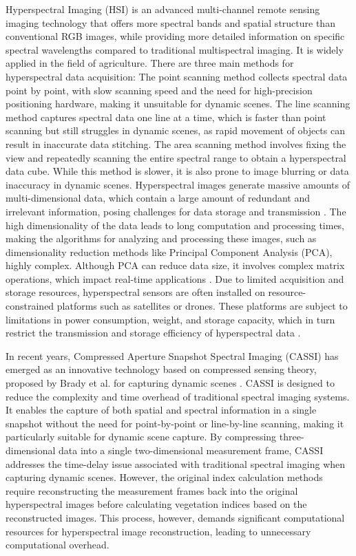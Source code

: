 \documentclass[preprint,review,12pt]{elsarticle}
\begin{document}
Hyperspectral Imaging (HSI) is an advanced multi-channel remote sensing imaging technology that offers more spectral bands and spatial structure than conventional RGB images, while providing more detailed information on specific spectral wavelengths compared to traditional multispectral imaging. It is widely applied in the field of agriculture. There are three main methods for hyperspectral data acquisition: The point scanning method collects spectral data point by point, with slow scanning speed and the need for high-precision positioning hardware, making it unsuitable for dynamic scenes. The line scanning method captures spectral data one line at a time, which is faster than point scanning but still struggles in dynamic scenes, as rapid movement of objects can result in inaccurate data stitching. The area scanning method involves fixing the view and repeatedly scanning the entire spectral range to obtain a hyperspectral data cube. While this method is slower, it is also prone to image blurring or data inaccuracy in dynamic scenes. Hyperspectral images generate massive amounts of multi-dimensional data, which contain a large amount of redundant and irrelevant information, posing challenges for data storage and transmission \cite{ferrari2013}. The high dimensionality of the data leads to long computation and processing times, making the algorithms for analyzing and processing these images, such as dimensionality reduction methods like Principal Component Analysis (PCA), highly complex. Although PCA can reduce data size, it involves complex matrix operations, which impact real-time applications \cite{palmer2013}. Due to limited acquisition and storage resources, hyperspectral sensors are often installed on resource-constrained platforms such as satellites or drones. These platforms are subject to limitations in power consumption, weight, and storage capacity, which in turn restrict the transmission and storage efficiency of hyperspectral data \cite{nascimento2018}.

In recent years, Compressed Aperture Snapshot Spectral Imaging (CASSI) has emerged as an innovative technology based on compressed sensing theory, proposed by Brady et al. for capturing dynamic scenes \cite{brady2009,wagadarikar2008}. CASSI is designed to reduce the complexity and time overhead of traditional spectral imaging systems. It enables the capture of both spatial and spectral information in a single snapshot without the need for point-by-point or line-by-line scanning, making it particularly suitable for dynamic scene capture. By compressing three-dimensional data into a single two-dimensional measurement frame, CASSI addresses the time-delay issue associated with traditional spectral imaging when capturing dynamic scenes. However, the original index calculation methods require reconstructing the measurement frames back into the original hyperspectral images before calculating vegetation indices based on the reconstructed images. This process, however, demands significant computational resources for hyperspectral image reconstruction, leading to unnecessary computational overhead.
\end{document}
